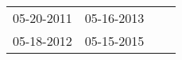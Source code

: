 \begin{supertabular}{llll}
 05-20-2011 &  05-16-2013 \\
 05-18-2012 &  05-15-2015 \\
\end{supertabular}
